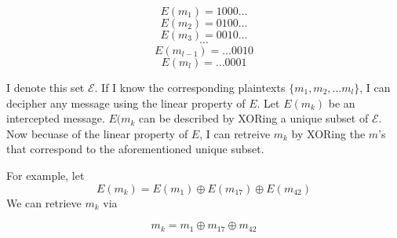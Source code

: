 \documentclass[a4paper,10pt]{article}
\begin{document}
$$E(m_{1}) = 1000\dots$$
$$E(m_{2}) = 0100\dots$$
$$E(m_{3}) = 0010\dots$$
$$\cdots{}$$
$$E(m_{l-1}) = \dots0010$$
$$E(m_{l}) = \dots0001$$

I denote this set $\mathscr{E}$. If I know the corresponding plaintexts $\{m_{1}, m_{2}, \dots m_{l}  \}$, I can decipher any message using the linear property of $E$. Let $E(m_{k})$ be an intercepted message. $E(m_{k}$ can be described by XORing a unique subset of  $\mathscr{E}$.  Now becuase of the linear property of $E$, I can retreive $m_{k}$ by XORing the $m$'s that correspond to the aforementioned unique subset.  

For example, let $$E(m_{k}) = E(m_{1}) \oplus E(m_{17}) \oplus E(m_{42}) $$ 
We can retrieve $m_{k}$ via

$$m_{k} = m_{1} \oplus m_{17} \oplus m_{42} $$
\end{document}
